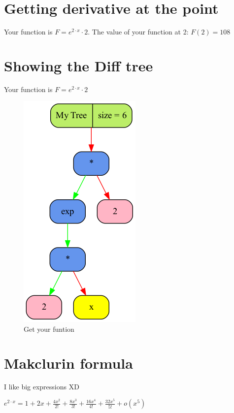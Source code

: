 \documentclass[12pt, letterpaper, twoside]{article}
\begin{document}
\section{Getting derivative at the point}
\begin{center}
Your function is $F = e^{2 \cdot x} \cdot 2$.
The value of your function at 2: $ F(2) = 108 $
\end{center}
\newpage
\section{Showing the Diff tree}
\begin{center}
Your function is $F = e^{2 \cdot x} \cdot 2$\newline 
\begin{figure}
\begin{center}
\includegraphics [scale = 0.4]{graphics/graph2.png}
\caption{Get your funtion}
\end{center}
\end{figure}
\end{center}
\newpage
\section{Makclurin formula}
I like big expressions XD\\
\begin{center}
$e^{2 \cdot x} =  1 +  2x + \frac{4x^{2}}{2!} + \frac{8x^{3}}{3!} + \frac{16x^{4}}{4!} + \frac{32x^{5}}{5!} + o(x^{5}) $
\end{center}
\end{document}
